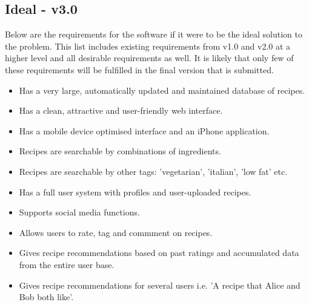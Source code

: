 \subsection{Ideal - v3.0}

Below are the requirements for the software if it were to be the ideal solution to the problem. This list includes existing requirements from v1.0 and v2.0 at a higher level and all desirable requirements as well. It is likely that only few of these requirements will be fulfilled in the final version that is submitted. 

\begin{itemize}
	\item Has a very large, automatically updated and maintained database of recipes.
	\item Has a clean, attractive and user-friendly web interface.
	\item Has a mobile device optimised interface and an iPhone application.
	\item Recipes are searchable by combinations of ingredients.
	\item Recipes are searchable by other tags: 'vegetarian', 'italian', 'low fat' etc.
	\item Has a full user system with profiles and user-uploaded recipes.
	\item Supports social media functions.
	\item Allows users to rate, tag and commment on recipes.
	\item Gives recipe recommendations based on past ratings and accumulated data from the entire user base.
	\item Gives recipe recommendations for several users i.e. 'A recipe that Alice and Bob both like'.

\end{itemize}
